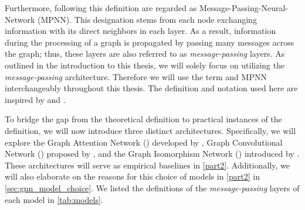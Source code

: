 Furthermore, \gnns following this definition are regarded as \textsf{Message-Passing-Neural-Network (MPNN)}. This designation stems from each node exchanging information with its direct neighbors in each layer. As a result, information during the processing of a graph is propagated by passing many messages across the graph; thus, these layers are also referred to as \textit{message-passing} layers. As outlined in the introduction to this thesis, we will solely focus on \gnns utilizing the \textit{message-passing} architecture. Therefore we will use the term \gnn and \textsf{MPNN} interchangeably throughout this thesis. The definition and notation used here are inspired by \cite{Morris2018} and \cite{Xu2018}.

To bridge the gap from the theoretical definition to practical instances of the definition, we will now introduce three distinct \gnn architectures. Specifically, we will explore the \textsf{Graph Attention Network} (\gat) developed by \cite{Velivckovic2017}, \textsf{Graph Convolutional Network} (\gcn) proposed by \cite{Kip+2017}, and the \textsf{Graph Isomorphism Network} (\gin) introduced by \cite{Xu2018}. These architectures will serve as empirical baselines in \cref{part2}. Additionally, we will also elaborate on the reasons for this choice of models in \cref{part2} in \cref{sec:gnn_model_choice}. We listed the definitions of the \textit{message-passing} layers of each model in \cref{tab:models}.

\begin{table}[H]
    \centering
    \caption{Overview of the construction of the \textit{message-passing} layers and their respective learnable parameters by popular \gnn architectures. A complete definition of the \gat architecture including the attention coefficient $\alpha_{vu}$ can be found in \cref{def:gat} in the Appendix.}
\end{table}

